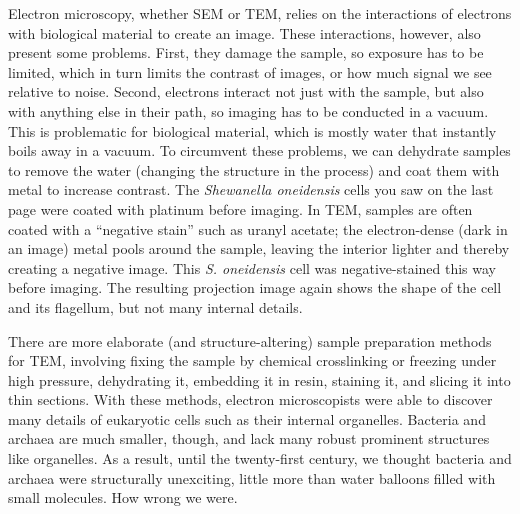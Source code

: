 \documentclass[]{tufte-book}
\begin{document}
Electron microscopy, whether SEM or TEM, relies on the interactions of
electrons with biological material to create an image. These
interactions, however, also present some problems. First, they damage
the sample, so exposure has to be limited, which in turn limits the
contrast of images, or how much signal we see relative to noise. Second,
electrons interact not just with the sample, but also with anything else
in their path, so imaging has to be conducted in a vacuum. This is
problematic for biological material, which is mostly water that
instantly boils away in a vacuum. To circumvent these problems, we can
dehydrate samples to remove the water (changing the structure in the
process) and coat them with metal to increase contrast. The
\emph{Shewanella oneidensis} cells you saw on the last page were coated
with platinum before imaging. In TEM, samples are often coated with a
``negative stain'' such as uranyl acetate; the electron-dense (dark in
an image) metal pools around the sample, leaving the interior lighter
and thereby creating a negative image. This \emph{S. oneidensis} cell
was negative-stained this way before imaging. The resulting projection
image again shows the shape of the cell and its flagellum, but not many
internal details.

There are more elaborate (and structure-altering) sample preparation
methods for TEM, involving fixing the sample by chemical crosslinking or
freezing under high pressure, dehydrating it, embedding it in resin,
staining it, and slicing it into thin sections. With these methods,
electron microscopists were able to discover many details of eukaryotic
cells such as their internal organelles. Bacteria and archaea are much
smaller, though, and lack many robust prominent structures like
organelles. As a result, until the twenty-first century, we thought
bacteria and archaea were structurally unexciting, little more than
water balloons filled with small molecules. How wrong we were.
\end{document}

